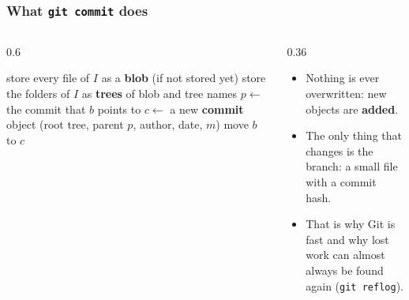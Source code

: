 \documentclass[aspectratio=169,10pt,compress]{beamer}
\begin{document}
\begin{frame}[t,fragile] \frametitle{What \texttt{git commit} does}
  \begin{columns}[T]
    \begin{column}{0.6\textwidth}
      \SetAlFnt{\small}


\begin{algorithm}[H]
  \caption{Commit}
  store every file of $I$ as a \textbf{blob} (if not stored yet)\;
  store the folders of $I$ as \textbf{trees} of blob and tree names\;
  $p \gets$ the commit that $b$ points to\;
  $c \gets$ a new \textbf{commit} object (root tree, parent $p$, author, date, $m$)\;
  move $b$ to $c$\;
\end{algorithm}

    \end{column}
    \begin{column}{0.36\textwidth}
      \begin{itemize}\small
        \item Nothing is ever overwritten: new objects are \textbf{added}.
        \item The only thing that changes is the branch: a small file with a commit hash.
        \item That is why Git is fast and why lost work can almost always be found again (\texttt{git reflog}).
      \end{itemize}
    \end{column}
  \end{columns}
\end{frame}

\end{document}
